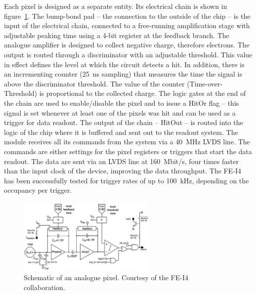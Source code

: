 Each pixel is designed as a separate entity. Its electrical chain is shown in figure~\ref{fig:anapix}. The bump-bond pad -- the connection to the outside of the chip -- is the input of the electrical chain, connected to a free-running amplification stage with adjustable peaking time using a 4-bit register at the feedback branch. The analogue amplifier is designed to collect negative charge, therefore electrons. The output is routed through a discriminator with an adjustable threshold. This value in effect defines the level at which the circuit detects a hit. In addition, there is an incrementing counter (25~ns sampling) that measures the time the signal is above the discriminator threshold. The value of the counter (Time-over-Threshold) is proportional to the collected charge. The logic gates at the end of the chain are used to enable/disable the pixel and to issue a HitOr flag -- this signal is set whenever at least one of the pixels was hit and can be used as a trigger for data readout. The output of the chain -- HitOut -- is routed into the logic of the chip where it is buffered and sent out to the readout system. The module receives all its commands from the system via a 40~MHz LVDS line. The commands are either settings for the pixel registers or triggers that start the data readout. The data are sent via an LVDS line at 160~Mbit/s, four times faster than the input clock of the device, improving the data throughput. The FE-I4 has been successfully tested for trigger rates of up to 100~kHz, depending on the occupancy per trigger. 

\begin{figure}[!t]
\centering
\includegraphics[width=0.6\textwidth]{04_charge_monitoring/pics/analogPix}
\caption{Schematic of an analogue pixel. Courtesy of the FE-I4 collaboration.~\cite{Albert:1477014}}
\label{fig:anapix}
\end{figure}

